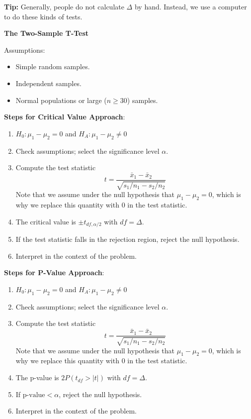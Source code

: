 \documentclass[
]{book}
\providecommand{\tightlist}{%
  \setlength{\itemsep}{0pt}\setlength{\parskip}{0pt}}
\begin{document}
\textbf{Tip:} Generally, people do not calculate \(\Delta\) by hand. Instead, we use a computer to do these kinds of tests.

\textbf{The Two-Sample T-Test}

Assumptions:

\begin{itemize}
\tightlist
\item
  Simple random samples.
\item
  Independent samples.
\item
  Normal populations or large (\(n \ge 30\)) samples.
\end{itemize}

\textbf{Steps for Critical Value Approach}:

\begin{enumerate}
\def\labelenumi{\arabic{enumi}.}
\tightlist
\item
  \(H_0: \mu_1 - \mu_2 = 0\) and \(H_A: \mu_1 - \mu_2 \ne 0\)
\item
  Check assumptions; select the significance level \(\alpha\).
\item
  Compute the test statistic \[t = \frac{\bar{x}_1 - \bar{x}_2}{\sqrt{s_1/n_1 - s_2/n_2}}\] Note that we assume under the null hypothesis that \(\mu_1 - \mu_2 = 0\), which is why we replace this quantity with \(0\) in the test statistic.
\item
  The critical value is \(\pm t_{df, \alpha/2}\) with \(df = \Delta\).
\item
  If the test statistic falls in the rejection region, reject the null hypothesis.
\item
  Interpret in the context of the problem.
\end{enumerate}

\textbf{Steps for P-Value Approach}:

\begin{enumerate}
\def\labelenumi{\arabic{enumi}.}
\tightlist
\item
  \(H_0: \mu_1 - \mu_2 = 0\) and \(H_A: \mu_1 - \mu_2 \ne 0\)
\item
  Check assumptions; select the significance level \(\alpha\).
\item
  Compute the test statistic \[t = \frac{\bar{x}_1 - \bar{x}_2}{\sqrt{s_1/n_1 - s_2/n_2}}\] Note that we assume under the null hypothesis that \(\mu_1 - \mu_2 = 0\), which is why we replace this quantity with \(0\) in the test statistic.
\item
  The p-value is \(2P(t_{df} > |t|)\) with \(df = \Delta\).
\item
  If \(\text{p-value}<\alpha\), reject the null hypothesis.
\item
  Interpret in the context of the problem.
\end{enumerate}
\end{document}
